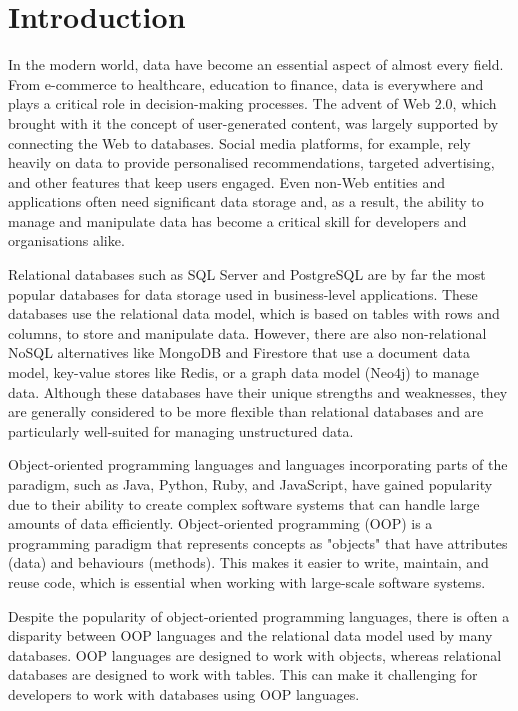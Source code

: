 \chapter{Introduction}

In the modern world, data have become an essential aspect of almost every field. From e-commerce to healthcare, education to finance, data is everywhere and plays a critical role in decision-making processes. The advent of Web 2.0, which brought with it the concept of user-generated content, was largely supported by connecting the Web to databases. Social media platforms, for example, rely heavily on data to provide personalised recommendations, targeted advertising, and other features that keep users engaged. Even non-Web entities and applications often need significant data storage and, as a result, the ability to manage and manipulate data has become a critical skill for developers and organisations alike.\par
Relational databases such as SQL Server and PostgreSQL are by far the most popular databases for data storage used in business-level applications. These databases use the relational data model, which is based on tables with rows and columns, to store and manipulate data. However, there are also non-relational NoSQL alternatives like MongoDB and Firestore that use a document data model, key-value stores like Redis, or a graph data model (Neo4j) to manage data. Although these databases have their unique strengths and weaknesses, they are generally considered to be more flexible than relational databases and are particularly well-suited for managing unstructured data.\par
Object-oriented programming languages and languages incorporating parts of the paradigm, such as Java, Python, Ruby, and JavaScript, have gained popularity due to their ability to create complex software systems that can handle large amounts of data efficiently. Object-oriented programming (OOP) is a programming paradigm that represents concepts as "objects" that have attributes (data) and behaviours (methods). This makes it easier to write, maintain, and reuse code, which is essential when working with large-scale software systems.\par
Despite the popularity of object-oriented programming languages, there is often a disparity between OOP languages and the relational data model used by many databases. OOP languages are designed to work with objects, whereas relational databases are designed to work with tables. This can make it challenging for developers to work with databases using OOP languages. \par
